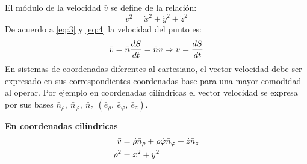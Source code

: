 \documentclass[11pt]{article}
\begin{document}
El módulo de la velocidad $\bar{v} $ se define de la relación:
\begin{equation*}
v^2 = \dot{x}^2 + \dot{y}^2 + \dot{z}^2 
\end{equation*}De acuerdo  a \eqref{eq:3} y \eqref{eq:4} la velocidad del punto es:
\begin{align}
\bar{v} = \bar{n} \dfrac{dS}{dt} = \bar{n}v \Rightarrow v = \dfrac{dS}{dt} \notag
\end{align}
En sistemas de coordenadas diferentes al cartesiano, el vector velocidad debe ser expresado en sus correspondientes coordenadas base para una mayor comodidad al operar.
Por ejemplo en coordenadas cilíndricas el vector velocidad se expresa por sus bases $\bar{n}_\rho,\ \bar{n}_\varphi,\ \bar{n}_z$ $(\bar{e}_\rho,\ \bar{e}_\varphi,\ \bar{e}_z)$.

\vspace{1.5cm}

\begin{minipage}{\textwidth}
\begin{wrapfigure}{l}{0.45\textwidth}
\centering
{}
\end{wrapfigure}
\textbf{En coordenadas cilíndricas}
\begin{align}
	\bar{v} &= \dot{\rho} \bar{n}_\rho + \rho \dot{\varphi}\bar{n}_\varphi + \dot{z}\bar{n}_z \notag \\
    \rho^2 &= x^2 + y^2 \notag
\end{align}
\end{minipage}
\end{document}
